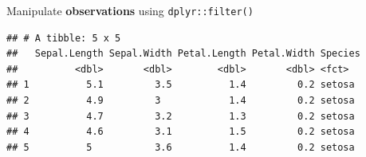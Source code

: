 \documentclass[14pt,ignorenonframetext,]{bredelebeamer}
\newenvironment{Shaded}{\begin{snugshade}}{\end{snugshade}}
\newcommand{\KeywordTok}[1]{\textcolor[rgb]{0.94,0.87,0.69}{#1}}
\newcommand{\DecValTok}[1]{\textcolor[rgb]{0.86,0.86,0.80}{#1}}
\newcommand{\StringTok}[1]{\textcolor[rgb]{0.80,0.58,0.58}{#1}}
\newcommand{\OperatorTok}[1]{\textcolor[rgb]{0.94,0.94,0.82}{#1}}
\newcommand{\NormalTok}[1]{\textcolor[rgb]{0.80,0.80,0.80}{#1}}
\begin{document}
\begin{frame}[fragile]{Manipulate \textbf{observations} using
\texttt{dplyr::filter()}}

\begin{Shaded}
\end{Shaded}

\begin{verbatim}
## # A tibble: 5 x 5
##   Sepal.Length Sepal.Width Petal.Length Petal.Width Species
##          <dbl>       <dbl>        <dbl>       <dbl> <fct>  
## 1          5.1         3.5          1.4         0.2 setosa 
## 2          4.9         3            1.4         0.2 setosa 
## 3          4.7         3.2          1.3         0.2 setosa 
## 4          4.6         3.1          1.5         0.2 setosa 
## 5          5           3.6          1.4         0.2 setosa
\end{verbatim}

\begin{Shaded}
\end{Shaded}

\end{frame}
\end{document}
